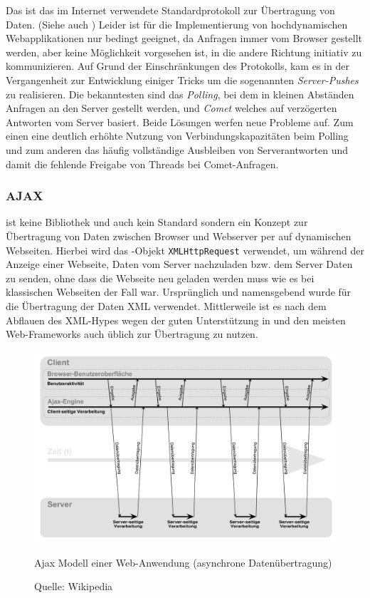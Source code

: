 Das  ist das im Internet verwendete Standardprotokoll zur Übertragung von Daten. (Siehe
auch \cite{http}) Leider ist  für die Implementierung von hochdynamischen Webapplikationen
nur bedingt geeignet, da Anfragen immer vom Browser gestellt werden, aber keine Möglichkeit
vorgesehen ist, in die andere Richtung initiativ zu kommunizieren.  Auf Grund der Einschränkungen
des Protokolls, kam es in der Vergangenheit zur Entwicklung einiger Tricks um die sogenannten
\textit{Server-Pushes} zu realisieren. Die bekanntesten sind das \textit{Polling}, bei dem in
kleinen Abständen Anfragen an den Server gestellt werden, und \textit{Comet} welches auf verzögerten
Antworten vom Server basiert. Beide Lösungen werfen neue Probleme auf. Zum einen eine deutlich
erhöhte Nutzung von Verbindungskapazitäten beim Polling und zum anderen das häufig vollständige
Ausbleiben von Serverantworten und damit die fehlende Freigabe von Threads bei Comet-Anfragen.

\subsubsection{AJAX}

 ist keine Bibliothek und auch kein  Standard sondern ein Konzept zur Übertragung von
Daten  zwischen Browser und Webserver per  auf dynamischen Webseiten. Hierbei wird das
-Objekt \texttt{XMLHttpRequest} verwendet, um während der Anzeige einer Webseite, Daten vom
Server nachzuladen bzw. dem Server Daten zu senden, ohne dass die Webseite neu geladen werden muss
wie es bei klassischen Webseiten der Fall war. Ursprünglich und namensgebend wurde für die
Übertragung der Daten XML verwendet. Mittlerweile ist es nach dem Abflauen des XML-Hypes wegen der
guten Unterstützung in  und den meisten Web-Frameworks auch üblich  zur Übertragung
zu nutzen. \cite{ajax}

\begin{figure}[ht]
\includegraphics[width=\linewidth]{images/diagram-ajax}
  \caption{Ajax Modell einer Web-Anwendung (asynchrone Datenübertragung)}
  \caption*{Quelle: Wikipedia}
  \label{fig:diagram-ajax}
\end{figure}

